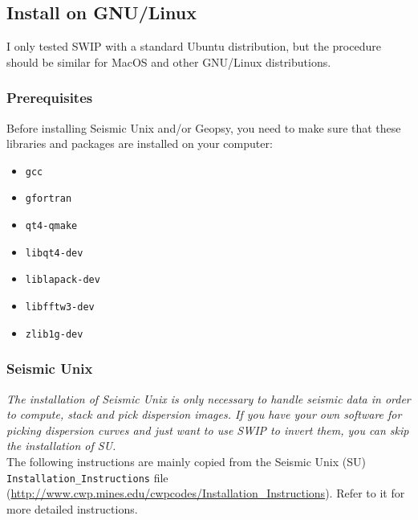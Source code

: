 \documentclass[twoside,a4paper]{article}
\begin{document}
\subsection{Install on GNU/Linux}
I only tested SWIP with a standard Ubuntu distribution, but the procedure should be similar for MacOS and other GNU/Linux distributions.
\subsubsection{Prerequisites}
Before installing Seismic Unix and/or Geopsy, you need to make sure that these libraries and packages are installed on your computer:

\begin{itemize}
\item \verb|gcc|
\item \verb|gfortran|
\item \verb|qt4-qmake|
\item \verb|libqt4-dev|
\item \verb|liblapack-dev|
\item \verb|libfftw3-dev|
\item \verb|zlib1g-dev|

\end{itemize}
\subsubsection{Seismic Unix}
\textit{The installation of Seismic Unix is only necessary to handle seismic data in order to compute, stack and pick dispersion images. If you have your own software for picking dispersion curves and just want to use SWIP to invert them, you can skip the installation of SU.}\\[2ex]
The following instructions are mainly copied from the Seismic Unix (SU) \verb|Installation_Instructions| file (\url{http://www.cwp.mines.edu/cwpcodes/Installation_Instructions}). Refer to it for more detailed instructions.
\end{document}
